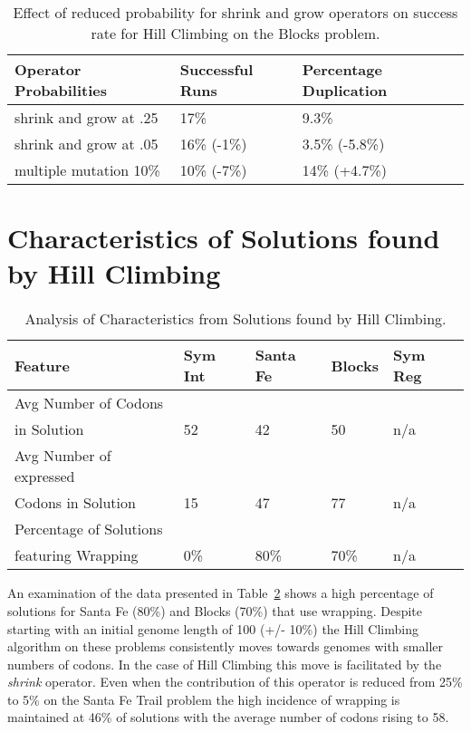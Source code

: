 \begin{table}[h]
\begin{center}
\begin{tabular}{|l|l|l|}
\hline
Operator Probabilities  & Successful Runs & Percentage Duplication \\
\hline
shrink and grow at .25  & 17\%             & 9.3\%\\
shrink and grow at .05  & 16\% (-1\%)      & 3.5\% (-5.8\%)\\
multiple mutation 10\%  & 10\% (-7\%)      & 14\% (+4.7\%) \\
\hline
\end{tabular}
\caption{\label{hc_blocks_altmut_table} Effect of reduced probability for shrink and grow operators on success rate for Hill Climbing on the Blocks problem.}
\end{center}
\end{table}




\section{Characteristics of Solutions found by Hill Climbing}

\begin{table}[h]
\begin{center}
\begin{tabular}{|l|l|l|l|l|}
\hline
Feature & Sym Int & Santa Fe & Blocks & Sym Reg  \\
\hline
Avg Number of Codons & & & &  \\ 
in Solution & 52 & 42 & 50 & n/a  \\
Avg Number of expressed & & & &  \\
Codons in Solution & 15 & 47 & 77  & n/a  \\
Percentage of Solutions & & & & \\
featuring Wrapping & 0\% & 80\% & 70\% & n/a  \\
\hline
\end{tabular}
\caption{\label{hc_results_analysis_table} Analysis of Characteristics from Solutions found by Hill Climbing.}
\end{center}
\end{table}

An examination of the data presented in Table~\ref{hc_results_analysis_table} shows a  high percentage of solutions for Santa Fe (80\%) and Blocks (70\%) that use wrapping. Despite starting with an initial genome length of 100 (+/- 10\%) the Hill Climbing algorithm on these problems consistently moves towards genomes with smaller numbers of codons. In the case of Hill Climbing this move is facilitated by the \emph{shrink} operator. Even when the contribution of this operator is reduced from 25\% to 5\% on the Santa Fe Trail problem the high incidence of wrapping is maintained at 46\% of solutions with the average number of codons rising to 58.

